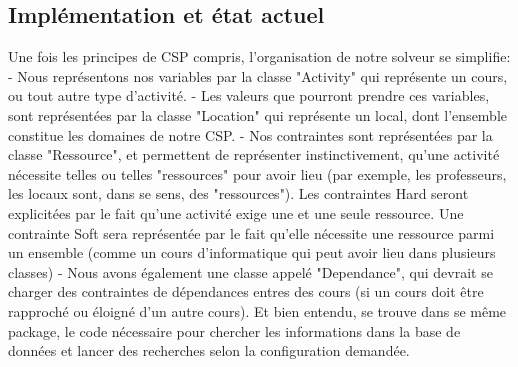 \subsection{Implémentation et état actuel}
Une fois les principes de CSP compris, l'organisation de notre solveur se simplifie: 
- Nous représentons nos variables par la classe "Activity" qui représente un cours, ou tout autre type d'activité.\newline
- Les valeurs que pourront prendre ces variables, sont représentées par la classe "Location" qui représente un local, dont l'ensemble constitue les domaines de notre CSP.\newline
- Nos contraintes sont représentées par la classe "Ressource", et permettent de représenter instinctivement, qu'une activité nécessite telles ou telles "ressources" pour avoir lieu (par exemple, les professeurs, les locaux sont, dans se sens, des "ressources"). Les contraintes Hard seront explicitées par le fait qu'une activité exige une et une seule ressource. Une contrainte Soft sera représentée par le fait qu'elle nécessite une ressource parmi un ensemble (comme un cours d'informatique qui peut avoir lieu dans plusieurs classes) \newline
- Nous avons également une classe appelé "Dependance", qui devrait se charger des contraintes de dépendances entres des cours (si un cours doit être rapproché ou éloigné d'un autre cours). \newline
Et bien entendu, se trouve dans se même package, le code nécessaire pour chercher les informations dans la base de données et lancer des recherches selon la configuration demandée.

\indent

